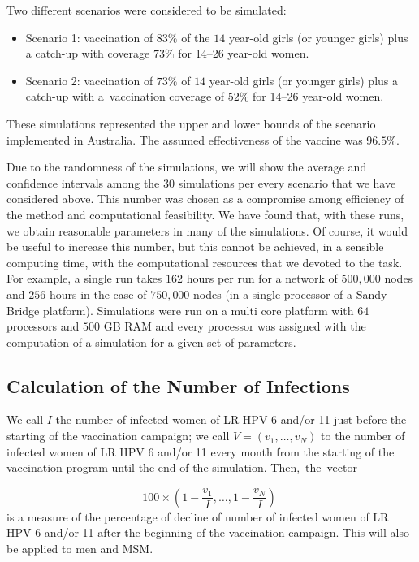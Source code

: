 Two different scenarios were considered to be simulated:

\begin{itemize}[leftmargin=*,labelsep=5mm]
\item Scenario 1: vaccination of $83\%$ of the $14$ year-old girls (or younger girls) plus a catch-up with coverage $73\%$ for 14--26 year-old women.
\item Scenario 2: vaccination of $73\%$ of $14$ year-old girls (or younger girls) plus a catch-up with a~vaccination coverage of $52\%$ for 14--26 year-old women.
\end{itemize}

These simulations represented the upper and lower bounds of the scenario implemented in Australia. The assumed effectiveness of the vaccine was $96.5\%$.

Due to the randomness of the simulations, we will show the average and confidence intervals among the $30$ simulations per every scenario that we have considered above. This number was chosen as a compromise among efficiency of the method and computational feasibility. We have found that, with these runs, we obtain reasonable parameters in many of the simulations. Of course, it would be useful to increase this number, but this cannot be achieved, in a sensible computing time, with the computational resources that we
devoted to the task. For example, a single run takes $162$ hours per run for a network of $500,000$ nodes 
and $256$ hours in the case of $750,000$ nodes
(in a single processor of a Sandy Bridge platform). Simulations were run on a multi core platform with $64$ processors and $500$ GB RAM and every processor was assigned with the computation of a simulation for a given set of parameters.

\subsection{Calculation of the Number of Infections}

We call $I$ the number of infected women of LR HPV 6 and/or 11 just before the starting of the vaccination campaign; we call $V = ( v_1, \ldots, v_N)$ to the number of infected women of LR HPV 6 and/or 11 every month from the starting of the vaccination program until the end of the simulation. Then,~the~vector 

\begin{equation}
100 \times \left( 1-\displaystyle\frac{v_1}{I}, \ldots, 1-\displaystyle\frac{v_N}{I} \right) \; 
\end{equation}
is a measure of the percentage of decline of number of infected women of LR HPV 6 and/or 11 after the beginning of the vaccination campaign. This will also be applied to men and MSM.

